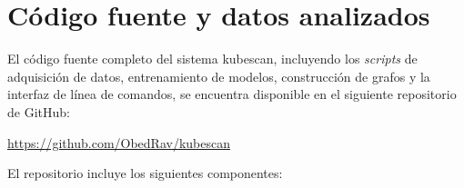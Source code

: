\chapter{Código fuente y datos analizados}
\label{ap:repositorio}

El código fuente completo del sistema kubescan, incluyendo los
\textit{scripts} de adquisición de datos, entrenamiento de modelos,
construcción de grafos y la interfaz de línea de comandos, se encuentra
disponible en el siguiente repositorio de GitHub:

\begin{center}
  \url{https://github.com/ObedRav/kubescan}
\end{center}

El repositorio incluye los siguientes componentes:

